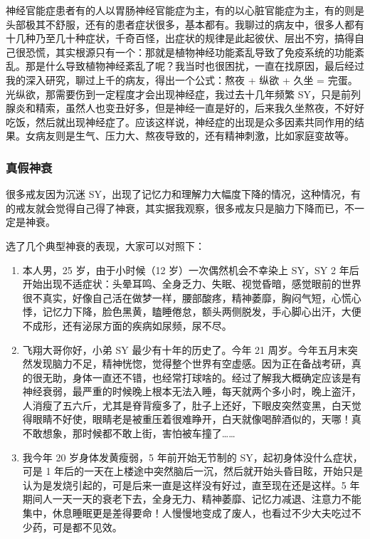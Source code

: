 \documentclass[fontset=founder]{ctexart}
\begin{document}
神经官能症患者有的人以胃肠神经官能症为主，有的以心脏官能症为主，有的则是头部极其不舒服，还有的患者症状很多，基本都有。我聊过的病友中，很多人都有十几种乃至几十种症状，千奇百怪，出症状的规律是此起彼伏、层出不穷，搞得自己很恐慌，其实根源只有一个：那就是植物神经功能紊乱导致了免疫系统的功能紊乱。那是什么导致植物神经紊乱了呢？我当时也很困扰，一直在找原因，最后经过我的深入研究，聊过上千的病友，得出一个公式：熬夜 + 纵欲 + 久坐 = 完蛋。光纵欲，那需要伤到一定程度才会出现神经症，我过去十几年频繁 SY，只是前列腺炎和精索，虽然人也变丑好多，但是神经一直是好的，后来我久坐熬夜，不好好吃饭，然后就出现神经症了。应该这样说，神经症的出现是众多因素共同作用的结果。女病友则是生气、压力大、熬夜导致的，还有精神刺激，比如家庭变故等。

\subsubsection{真假神衰}

很多戒友因为沉迷 SY，出现了记忆力和理解力大幅度下降的情况，这种情况，有的戒友就会觉得自己得了神衰，其实据我观察，很多戒友只是脑力下降而已，不一定是神衰。

选了几个典型神衰的表现，大家可以对照下：

\begin{enumerate}
    \item 本人男，25 岁，由于小时候（12 岁）一次偶然机会不幸染上 SY，SY 2 年后开始出现不适症状：头晕耳鸣、全身乏力、失眠、视觉昏暗，感觉眼前的世界很不真实，好像自己活在做梦一样，腰部酸疼，精神萎靡，胸闷气短，心慌心悸，记忆力下降，脸色黑黄，瞌睡倦怠，额头两侧脱发，手心脚心出汗，大便不成形，还有泌尿方面的疾病如尿频，尿不尽。
    \item 飞翔大哥你好，小弟 SY 最少有十年的历史了。今年 21 周岁。今年五月末突然发现脑力不足，精神恍惚，觉得整个世界有空虚感。因为正在备战考研，真的很无助，身体一直还不错，也经常打球啥的。经过了解我大概确定应该是有神经衰弱，最严重的时候晚上根本无法入睡，每天就两个多小时，晚上盗汗，人消瘦了五六斤，尤其是脊背瘦多了，肚子上还好，下眼皮突然变黑，白天觉得眼睛不好使，眼睛老是被重压着很难睁开，白天就像喝醉酒似的，天哪！真不敢想象，那时候都不敢上街，害怕被车撞了……
    \item 我今年 20 岁身体发黄瘦弱，5 年前开始无节制的 SY，起初身体没什么症状，可是 1 年后的一天在上楼途中突然脑后一沉，然后就开始头昏目眩，开始只是认为是发烧引起的，可是后来一直是这样没有好过，直至现在还是这样。5 年期间人一天一天的衰老下去，全身无力、精神萎靡、记忆力减退、注意力不能集中，休息睡眠更是差得要命！人慢慢地变成了废人，也看过不少大夫吃过不少药，可是都不见效。
\end{enumerate}
\end{document}
